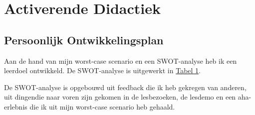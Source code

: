 
\section{Activerende Didactiek}
\subsection{Persoonlijk Ontwikkelingsplan}
\label{sec:didactiek}

Aan de hand van mijn worst-case scenario en een SWOT-analyse heb ik een leerdoel ontwikkeld. De SWOT-analyse is uitgewerkt in \hyperref[tab:SWOTDidactiek]{Tabel 1}.

De SWOT-analyse is opgebouwd uit feedback die ik heb gekregen van anderen, uit dingendie naar voren zijn gekomen in de lesbezoeken, de lesdemo en een aha-erlebnis die ik uit mijn worst-case scenario heb gehaald.


